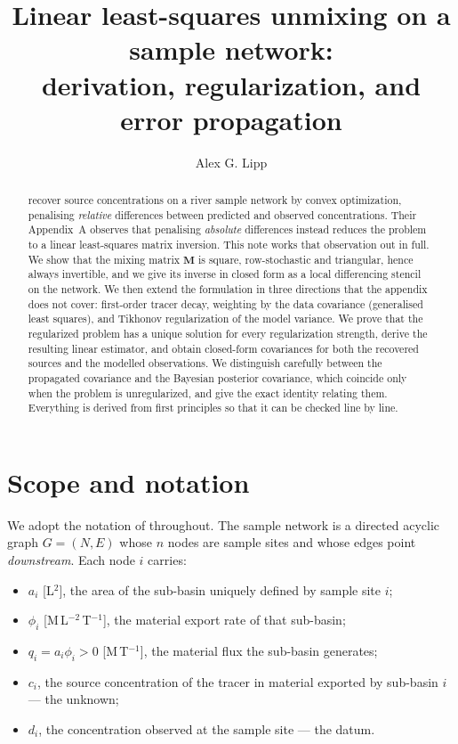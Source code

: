 \documentclass[11pt]{article}
\title{Linear least-squares unmixing on a sample network:\\derivation, regularization, and error propagation}
\author[1]{Alex G. Lipp}
\affil[1]{Department of Earth Sciences, University College London}
\date{}
\newcommand{\Mmat}{\ensuremath{\mathbf{M}}\xspace}
\theoremstyle{definition}
\begin{document}
\maketitle

\begin{abstract}
\noindent
\textcite{barnes_using_2024} recover source concentrations on a river sample network by
convex optimization, penalising \textit{relative} differences between predicted and observed
concentrations. Their Appendix~A observes that penalising \textit{absolute} differences
instead reduces the problem to a linear least-squares matrix inversion. This note works that
observation out in full. We show that the mixing matrix $\Mmat$ is square, row-stochastic and
triangular, hence always invertible, and we give its inverse in closed form as a local
differencing stencil on the network. We then extend the formulation in three directions that
the appendix does not cover: first-order tracer decay, weighting by the data covariance
(generalised least squares), and Tikhonov regularization of the model variance. We prove that
the regularized problem has a unique solution for every regularization strength, derive the
resulting linear estimator, and obtain closed-form covariances for both the recovered sources
and the modelled observations. We distinguish carefully between the propagated covariance and
the Bayesian posterior covariance, which coincide only when the problem is unregularized, and
give the exact identity relating them. Everything is derived from first principles so that it
can be checked line by line.
\end{abstract}

\vspace{3mm}

\section{Scope and notation}

We adopt the notation of \textcite{barnes_using_2024} throughout. The sample network is a
directed acyclic graph $G = (N, E)$ whose $n$ nodes are sample sites and whose edges point
\textit{downstream}. Each node $i$ carries:

\begin{itemize}
  \item $a_i$ [L$^2$], the area of the sub-basin uniquely defined by sample site $i$;
  \item $\phi_i$ [M\,L$^{-2}$\,T$^{-1}$], the material export rate of that sub-basin;
  \item $q_i = a_i \phi_i > 0$ [M\,T$^{-1}$], the material flux the sub-basin generates;
  \item $c_i$, the source concentration of the tracer in material exported by sub-basin $i$
        --- the unknown;
  \item $d_i$, the concentration observed at the sample site --- the datum.
\end{itemize}
\end{document}
